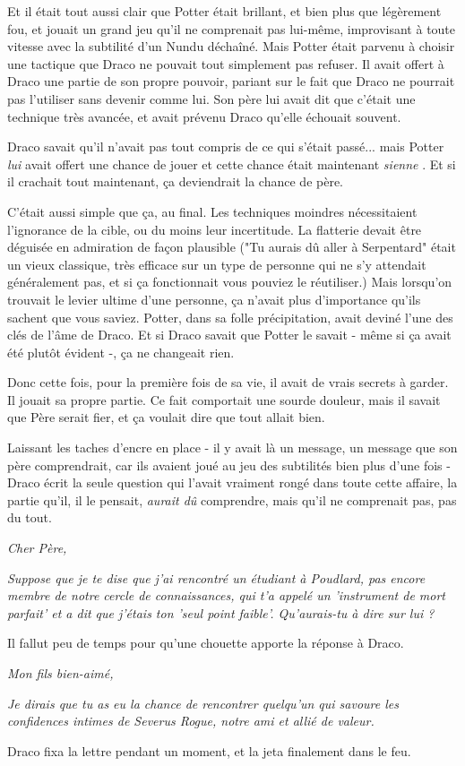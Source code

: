 Et il était tout aussi clair que Potter était brillant, et bien plus que légèrement fou, et jouait un grand jeu qu'il ne comprenait pas lui-même, improvisant à toute vitesse avec la subtilité d'un Nundu déchaîné. Mais Potter était parvenu à choisir une tactique que Draco ne pouvait tout simplement pas refuser. Il avait offert à Draco une partie de son propre pouvoir, pariant sur le fait que Draco ne pourrait pas l'utiliser sans devenir comme lui. Son père lui avait dit que c'était une technique très avancée, et avait prévenu Draco qu'elle échouait souvent.

Draco savait qu'il n'avait pas tout compris de ce qui s'était passé... mais Potter \emph{lui}  avait offert une chance de jouer et cette chance était maintenant \emph{sienne} . Et si il crachait tout maintenant, ça deviendrait la chance de père.

C'était aussi simple que ça, au final. Les techniques moindres nécessitaient l'ignorance de la cible, ou du moins leur incertitude. La flatterie devait être déguisée en admiration de façon plausible ("Tu aurais dû aller à Serpentard" était un vieux classique, très efficace sur un type de personne qui ne s'y attendait généralement pas, et si ça fonctionnait vous pouviez le réutiliser.) Mais lorsqu'on trouvait le levier ultime d'une personne, ça n'avait plus d'importance qu'ils sachent que vous saviez. Potter, dans sa folle précipitation, avait deviné l'une des clés de l'âme de Draco. Et si Draco savait que Potter le savait - même si ça avait été plutôt évident -, ça ne changeait rien.

Donc cette fois, pour la première fois de sa vie, il avait de vrais secrets à garder. Il jouait sa propre partie. Ce fait comportait une sourde douleur, mais il savait que Père serait fier, et ça voulait dire que tout allait bien.

Laissant les taches d'encre en place - il y avait là un message, un message que son père comprendrait, car ils avaient joué au jeu des subtilités bien plus d'une fois - Draco écrit la seule question qui l'avait vraiment rongé dans toute cette affaire, la partie qu'il, il le pensait, \emph{aurait dû}  comprendre, mais qu'il ne comprenait pas, pas du tout.

\emph{Cher Père,} 

\emph{Suppose que je te dise que j'ai rencontré un étudiant à Poudlard, pas encore membre de notre cercle de connaissances, qui t'a appelé un 'instrument de mort parfait' et a dit que j'étais ton 'seul point faible'. Qu'aurais-tu à dire sur lui ?} 

Il fallut peu de temps pour qu'une chouette apporte la réponse à Draco.

\emph{Mon fils bien-aimé,} 

\emph{Je dirais que tu as eu la chance de rencontrer quelqu'un qui savoure les confidences intimes de Severus Rogue, notre ami et allié de valeur.} 

Draco fixa la lettre pendant un moment, et la jeta finalement dans le feu.

